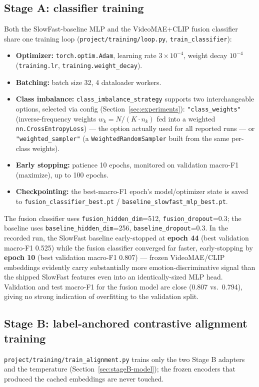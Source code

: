 \documentclass[11pt]{article}
\begin{document}
\subsection{Stage A: classifier training}
\label{sec:train-stageA}
Both the SlowFast-baseline MLP and the VideoMAE+CLIP fusion classifier share one training loop
(\texttt{project/training/loop.py}, \texttt{train\_classifier}):
\begin{itemize}
  \item \textbf{Optimizer:} \texttt{torch.optim.Adam}, learning rate $3\times10^{-4}$, weight decay
  $10^{-4}$ (\texttt{training.lr}, \texttt{training.weight\_decay}).
  \item \textbf{Batching:} batch size 32, 4 dataloader workers.
  \item \textbf{Class imbalance:} \texttt{class\_imbalance\_strategy} supports two interchangeable
  options, selected via config (Section~\ref{sec:experiments}): \texttt{"class\_weights"} (inverse-frequency
  weights $w_k = N/(K\cdot n_k)$ fed into a weighted \texttt{nn.CrossEntropyLoss}) --- the option
  actually used for all reported runs --- or \texttt{"weighted\_sampler"} (a
  \texttt{WeightedRandomSampler} built from the same per-class weights).
  \item \textbf{Early stopping:} patience 10 epochs, monitored on validation macro-F1 (maximize),
  up to 100 epochs.
  \item \textbf{Checkpointing:} the best-macro-F1 epoch's model/optimizer state is saved to
  \texttt{fusion\_classifier\_best.pt} / \texttt{baseline\_slowfast\_mlp\_best.pt}.
\end{itemize}
The fusion classifier uses \texttt{fusion\_hidden\_dim}=512, \texttt{fusion\_dropout}=0.3; the
baseline uses \texttt{baseline\_hidden\_dim}=256, \texttt{baseline\_dropout}=0.3. In the recorded
run, the SlowFast baseline early-stopped at \textbf{epoch 44} (best validation macro-F1 0.525)
while the fusion classifier converged far faster, early-stopping by \textbf{epoch 10} (best
validation macro-F1 0.807) --- frozen VideoMAE/CLIP embeddings evidently carry substantially more
emotion-discriminative signal than the shipped SlowFast features even into an identically-sized MLP
head. Validation and test macro-F1 for the fusion model are close (0.807 vs.\ 0.794), giving no
strong indication of overfitting to the validation split.

\subsection{Stage B: label-anchored contrastive alignment training}
\label{sec:train-stageB}
\texttt{project/training/train\_alignment.py} trains only the two Stage B adapters and the
temperature (Section~\ref{sec:stageB-model}); the frozen encoders that produced the cached
embeddings are never touched.
\end{document}
